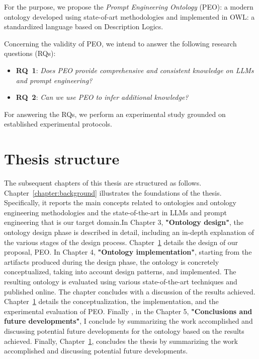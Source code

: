 For the purpose, we propose the \textit{Prompt Engineering Ontology} (PEO): a modern ontology developed using state-of-art methodologies and implemented in OWL: a standardized language based on Description Logics.

Concerning the validity of PEO, we intend to answer the following research questions (RQs):
\begin{itemize}
    \item \textbf{RQ~1}: \textit{Does PEO provide comprehensive and consistent knowledge on LLMs and prompt engineering?}

    \item \textbf{RQ~2}: \textit{Can we use PEO to infer additional knowledge?}
\end{itemize}
For answering the RQs, we perform an experimental study grounded on established experimental protocols.


\section{Thesis structure}
The subsequent chapters of this thesis are structured as follows. 
Chapter~\ref{chapter:background} illustrates the foundations of the thesis.
Specifically, it reports the main concepts related to ontologies and ontology engineering methodologies and the state-of-the-art in LLMs and prompt engineering that is our target domain.In Chapter 3, \textbf{"Ontology design"}, the ontology design phase is described in detail, including an in-depth explanation of the various stages of the design process. 
Chapter~\ref{} details the design of our proposal, PEO. 
In Chapter 4, \textbf{"Ontology implementation"}, starting from the artifacts produced during the design phase, the ontology is concretely conceptualized, taking into account design patterns, and implemented. The resulting ontology is evaluated using various state-of-the-art techniques and published online. The chapter concludes with a discussion of the results achieved.
Chapter~\ref{} details the conceptualization, the implementation, and the experimental evaluation of PEO. 
Finally , in the Chapter 5, \textbf{"Conclusions and future developments"}, I conclude by summarizing the work accomplished and discussing potential future developments for the ontology based on the results achieved.
Finally, Chapter~\ref{}, concludes the thesis by summarizing the work accomplished and discussing potential future developments.
